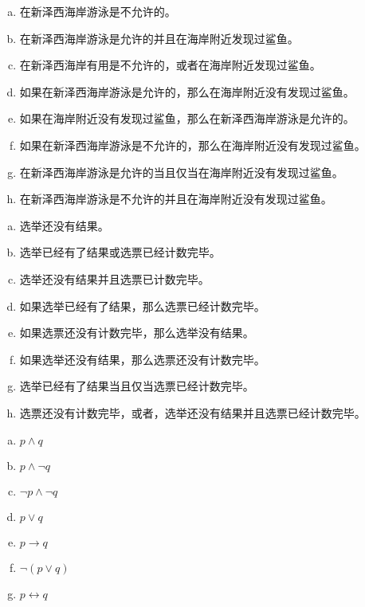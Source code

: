 {{        %
        \begin{practices}
            \begin{enumerate}[a)]
                \item 在新泽西海岸游泳是不允许的。
                \item 在新泽西海岸游泳是允许的并且在海岸附近发现过鲨鱼。
                \item 在新泽西海岸有用是不允许的，或者在海岸附近发现过鲨鱼。
                \item 如果在新泽西海岸游泳是允许的，那么在海岸附近没有发现过鲨鱼。
                \item 如果在海岸附近没有发现过鲨鱼，那么在新泽西海岸游泳是允许的。
                \item 如果在新泽西海岸游泳是不允许的，那么在海岸附近没有发现过鲨鱼。
                \item 在新泽西海岸游泳是允许的当且仅当在海岸附近没有发现过鲨鱼。
                \item 在新泽西海岸游泳是不允许的并且在海岸附近没有发现过鲨鱼。
            \end{enumerate}
        \end{practices}

        \begin{practices}
            \begin{enumerate}[a)]
                \item 选举还没有结果。
                \item 选举已经有了结果或选票已经计数完毕。
                \item 选举还没有结果并且选票已计数完毕。
                \item 如果选举已经有了结果，那么选票已经计数完毕。
                \item 如果选票还没有计数完毕，那么选举没有结果。
                \item 如果选举还没有结果，那么选票还没有计数完毕。
                \item 选举已经有了结果当且仅当选票已经计数完毕。
                \item 选票还没有计数完毕，或者，选举还没有结果并且选票已经计数完毕。
            \end{enumerate}
        \end{practices}

        \begin{practices}
            \begin{enumerate}[a)]
                \item $p \wedge q$
                \item $p \wedge \neg q$
                \item $\neg p \wedge \neg q$
                \item $p \vee q$
                \item $p \rightarrow q$
                \item $\neg(p \vee q)$
                \item $p \leftrightarrow q$
            \end{enumerate}
        \end{practices}

}}

